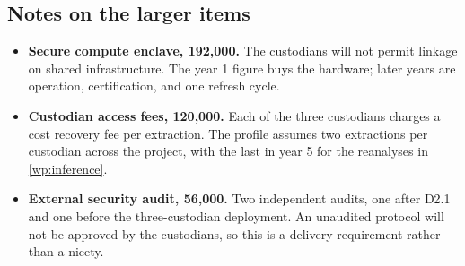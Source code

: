 \subsection{Notes on the larger items}

\begin{itemize}
  \item \textbf{Secure compute enclave, 192{,}000.} The custodians will not permit linkage on shared
    infrastructure. The year 1 figure buys the hardware; later years are operation, certification,
    and one refresh cycle.
  \item \textbf{Custodian access fees, 120{,}000.} Each of the three custodians charges a cost
    recovery fee per extraction. The profile assumes two extractions per custodian across the
    project, with the last in year 5 for the reanalyses in \ref{wp:inference}.
  \item \textbf{External security audit, 56{,}000.} Two independent audits, one after D2.1 and one
    before the three-custodian deployment. An unaudited protocol will not be approved by the
    custodians, so this is a delivery requirement rather than a nicety.
\end{itemize}
